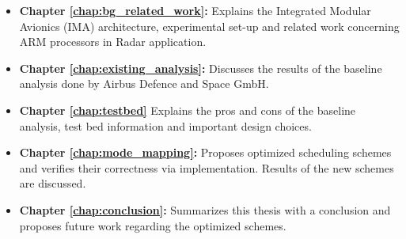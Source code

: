 \begin{itemize}
	\item \textbf{Chapter \ref{chap:bg_related_work}:} Explains the Integrated Modular Avionics (IMA) architecture, experimental set-up and related work concerning ARM processors in Radar application.

	\item \textbf{Chapter \ref{chap:existing_analysis}:} Discusses the results of the baseline analysis done by Airbus Defence and Space GmbH.

	\item \textbf{Chapter \ref{chap:testbed}} Explains the pros and cons of the baseline analysis, test bed information and important design choices.

	\item \textbf{Chapter \ref{chap:mode_mapping}:}  Proposes optimized scheduling schemes and verifies their correctness via implementation. Results of the new schemes are discussed.

	\item \textbf{Chapter \ref{chap:conclusion}:} Summarizes this thesis with a conclusion and proposes future work regarding the optimized schemes.
\end{itemize}
%

